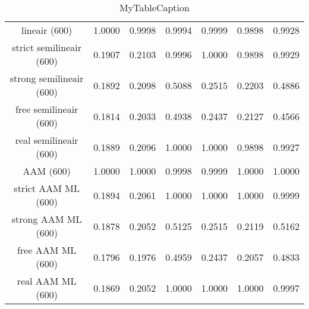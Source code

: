 \begin{table}
\centering
\begin{tabular}{|c|c|c|c|c|c|c|}
\hline
 &  &  &  &  &  &  \\
\hline
lineair (600) & 1.0000 & 0.9998 & 0.9994 & 0.9999 & 0.9898 & 0.9928 \\
\hline
strict semilineair (600) & 0.1907 & 0.2103 & 0.9996 & 1.0000 & 0.9898 & 0.9929 \\
\hline
strong semilineair (600) & 0.1892 & 0.2098 & 0.5088 & 0.2515 & 0.2203 & 0.4886 \\
\hline
free semilineair (600) & 0.1814 & 0.2033 & 0.4938 & 0.2437 & 0.2127 & 0.4566 \\
\hline
real semilineair (600) & 0.1889 & 0.2096 & 1.0000 & 1.0000 & 0.9898 & 0.9927 \\
\hline
AAM (600) & 1.0000 & 1.0000 & 0.9998 & 0.9999 & 1.0000 & 1.0000 \\
\hline
strict AAM ML (600) & 0.1894 & 0.2061 & 1.0000 & 1.0000 & 1.0000 & 0.9999 \\
\hline
strong AAM ML (600) & 0.1878 & 0.2052 & 0.5125 & 0.2515 & 0.2119 & 0.5162 \\
\hline
free AAM ML (600) & 0.1796 & 0.1976 & 0.4959 & 0.2437 & 0.2057 & 0.4833 \\
\hline
real AAM ML (600) & 0.1869 & 0.2052 & 1.0000 & 1.0000 & 1.0000 & 0.9997 \\
\hline
\end{tabular}
\caption{MyTableCaption}
\label{table:MyTableLabel}
\end{table}
